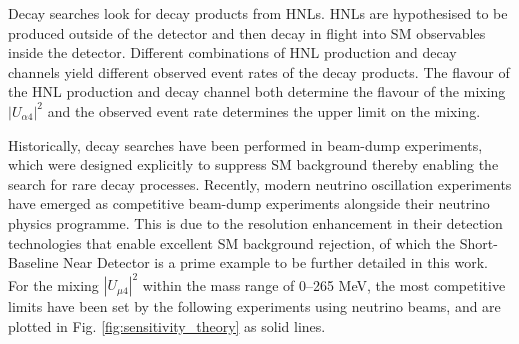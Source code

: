 Decay searches look for decay products from HNLs.
HNLs are hypothesised to be produced outside of the detector and then decay in flight into SM observables inside the detector.
Different combinations of HNL production and decay channels yield different observed event rates of the decay products.
The flavour of the HNL production and decay channel both determine the flavour of the mixing $|U_{\alpha4}|^2$ and the observed event rate determines the upper limit on the mixing.  

Historically, decay searches have been performed in beam-dump experiments, which were designed explicitly to suppress SM background thereby enabling the search for rare decay processes.
Recently, modern neutrino oscillation experiments have emerged as competitive beam-dump experiments alongside their neutrino physics programme.
This is due to the resolution enhancement in their detection technologies that enable excellent SM background rejection, of which the Short-Baseline Near Detector is a prime example to be further detailed in this work. 
For the mixing $|U_{\mu4}|^{2}$ within the mass range of 0--265 MeV, the most competitive limits have been set by the following experiments using neutrino beams, and are plotted in Fig. \ref{fig:sensitivity_theory} as solid lines.


